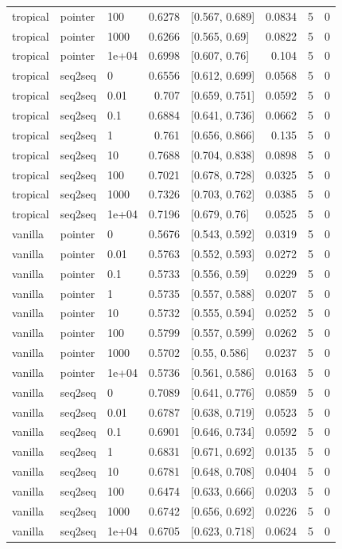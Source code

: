 \documentclass[10pt]{article}
\begin{document}
{\begin{longtable}{lllrlrrr}
tropical & pointer & 100 & 0.6278 & [0.567, 0.689] & 0.0834 & 5 & 0\\
tropical & pointer & 1000 & 0.6266 & [0.565, 0.69] & 0.0822 & 5 & 0\\
tropical & pointer & 1e+04 & 0.6998 & [0.607, 0.76] & 0.104 & 5 & 0\\
tropical & seq2seq & 0 & 0.6556 & [0.612, 0.699] & 0.0568 & 5 & 0\\
tropical & seq2seq & 0.01 & 0.707 & [0.659, 0.751] & 0.0592 & 5 & 0\\
tropical & seq2seq & 0.1 & 0.6884 & [0.641, 0.736] & 0.0662 & 5 & 0\\
tropical & seq2seq & 1 & 0.761 & [0.656, 0.866] & 0.135 & 5 & 0\\
tropical & seq2seq & 10 & 0.7688 & [0.704, 0.838] & 0.0898 & 5 & 0\\
tropical & seq2seq & 100 & 0.7021 & [0.678, 0.728] & 0.0325 & 5 & 0\\
tropical & seq2seq & 1000 & 0.7326 & [0.703, 0.762] & 0.0385 & 5 & 0\\
tropical & seq2seq & 1e+04 & 0.7196 & [0.679, 0.76] & 0.0525 & 5 & 0\\
vanilla & pointer & 0 & 0.5676 & [0.543, 0.592] & 0.0319 & 5 & 0\\
vanilla & pointer & 0.01 & 0.5763 & [0.552, 0.593] & 0.0272 & 5 & 0\\
vanilla & pointer & 0.1 & 0.5733 & [0.556, 0.59] & 0.0229 & 5 & 0\\
vanilla & pointer & 1 & 0.5735 & [0.557, 0.588] & 0.0207 & 5 & 0\\
vanilla & pointer & 10 & 0.5732 & [0.555, 0.594] & 0.0252 & 5 & 0\\
vanilla & pointer & 100 & 0.5799 & [0.557, 0.599] & 0.0262 & 5 & 0\\
vanilla & pointer & 1000 & 0.5702 & [0.55, 0.586] & 0.0237 & 5 & 0\\
vanilla & pointer & 1e+04 & 0.5736 & [0.561, 0.586] & 0.0163 & 5 & 0\\
vanilla & seq2seq & 0 & 0.7089 & [0.641, 0.776] & 0.0859 & 5 & 0\\
vanilla & seq2seq & 0.01 & 0.6787 & [0.638, 0.719] & 0.0523 & 5 & 0\\
vanilla & seq2seq & 0.1 & 0.6901 & [0.646, 0.734] & 0.0592 & 5 & 0\\
vanilla & seq2seq & 1 & 0.6831 & [0.671, 0.692] & 0.0135 & 5 & 0\\
vanilla & seq2seq & 10 & 0.6781 & [0.648, 0.708] & 0.0404 & 5 & 0\\
vanilla & seq2seq & 100 & 0.6474 & [0.633, 0.666] & 0.0203 & 5 & 0\\
vanilla & seq2seq & 1000 & 0.6742 & [0.656, 0.692] & 0.0226 & 5 & 0\\
vanilla & seq2seq & 1e+04 & 0.6705 & [0.623, 0.718] & 0.0624 & 5 & 0\\
\bottomrule
\end{longtable}
}
\end{document}
